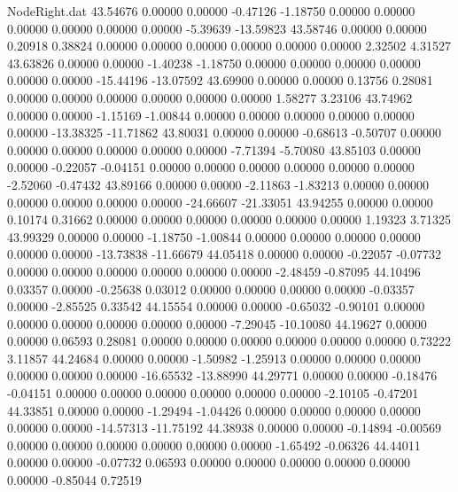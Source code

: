 \begin{filecontents}{NodeRight.dat}
  43.54676    0.00000    0.00000    -0.47126   -1.18750    0.00000    0.00000    0.00000    0.00000    0.00000    0.00000   -5.39639  -13.59823
  43.58746    0.00000    0.00000     0.20918    0.38824    0.00000    0.00000    0.00000    0.00000    0.00000    0.00000    2.32502    4.31527
  43.63826    0.00000    0.00000    -1.40238   -1.18750    0.00000    0.00000    0.00000    0.00000    0.00000    0.00000  -15.44196  -13.07592
  43.69900    0.00000    0.00000     0.13756    0.28081    0.00000    0.00000    0.00000    0.00000    0.00000    0.00000    1.58277    3.23106
  43.74962    0.00000    0.00000    -1.15169   -1.00844    0.00000    0.00000    0.00000    0.00000    0.00000    0.00000  -13.38325  -11.71862
  43.80031    0.00000    0.00000    -0.68613   -0.50707    0.00000    0.00000    0.00000    0.00000    0.00000    0.00000   -7.71394   -5.70080
  43.85103    0.00000    0.00000    -0.22057   -0.04151    0.00000    0.00000    0.00000    0.00000    0.00000    0.00000   -2.52060   -0.47432
  43.89166    0.00000    0.00000    -2.11863   -1.83213    0.00000    0.00000    0.00000    0.00000    0.00000    0.00000  -24.66607  -21.33051
  43.94255    0.00000    0.00000     0.10174    0.31662    0.00000    0.00000    0.00000    0.00000    0.00000    0.00000    1.19323    3.71325
  43.99329    0.00000    0.00000    -1.18750   -1.00844    0.00000    0.00000    0.00000    0.00000    0.00000    0.00000  -13.73838  -11.66679
  44.05418    0.00000    0.00000    -0.22057   -0.07732    0.00000    0.00000    0.00000    0.00000    0.00000    0.00000   -2.48459   -0.87095
  44.10496    0.03357    0.00000    -0.25638    0.03012    0.00000    0.00000    0.00000    0.00000   -0.03357    0.00000   -2.85525    0.33542
  44.15554    0.00000    0.00000    -0.65032   -0.90101    0.00000    0.00000    0.00000    0.00000    0.00000    0.00000   -7.29045  -10.10080
  44.19627    0.00000    0.00000     0.06593    0.28081    0.00000    0.00000    0.00000    0.00000    0.00000    0.00000    0.73222    3.11857
  44.24684    0.00000    0.00000    -1.50982   -1.25913    0.00000    0.00000    0.00000    0.00000    0.00000    0.00000  -16.65532  -13.88990
  44.29771    0.00000    0.00000    -0.18476   -0.04151    0.00000    0.00000    0.00000    0.00000    0.00000    0.00000   -2.10105   -0.47201
  44.33851    0.00000    0.00000    -1.29494   -1.04426    0.00000    0.00000    0.00000    0.00000    0.00000    0.00000  -14.57313  -11.75192
  44.38938    0.00000    0.00000    -0.14894   -0.00569    0.00000    0.00000    0.00000    0.00000    0.00000    0.00000   -1.65492   -0.06326
  44.44011    0.00000    0.00000    -0.07732    0.06593    0.00000    0.00000    0.00000    0.00000    0.00000    0.00000   -0.85044    0.72519

\end{filecontents}

